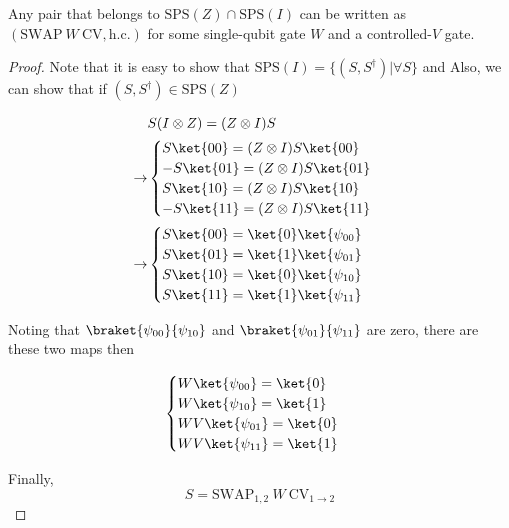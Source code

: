 \begin{lemma}
  Any pair that belongs to $\mathrm{SPS}(Z) \cap \mathrm{SPS}(I)$ 
  can be written as $(\mathrm{SWAP} ~ W ~ \mathrm{CV}, \text{h.c.})$ for some single-qubit gate $W$ and a controlled-$V$ gate.
\end{lemma}
\begin{proof}
Note that it is easy to show that $\mathrm{SPS}(I) = \{ (S, S^\dagger) | \forall S \}$ and 
Also, we can show that if $(S, S^\dagger) \in \mathrm{SPS}(Z)$

\begin{equation}
  \begin{aligned}
  &S(I \otimes Z) = (Z \otimes I) S \\
  \rightarrow &\begin{cases}
    S\ket{00} = (Z \otimes I) S\ket{00} \\
    - S\ket{01} = (Z \otimes I) S\ket{01} \\
    S\ket{10} = (Z \otimes I) S\ket{10} \\
    - S\ket{11} = (Z \otimes I) S\ket{11}
  \end{cases} \\
  \rightarrow &\begin{cases}
    S\ket{00} = \ket{0}\ket{\psi_{00}} \\
    S\ket{01} = \ket{1}\ket{\psi_{01}} \\
    S\ket{10} = \ket{0}\ket{\psi_{10}} \\
    S\ket{11} = \ket{1}\ket{\psi_{11}}
  \end{cases} \\
  \end{aligned}
\end{equation}

Noting that $\braket{\psi_{00}}{\psi_{10}}$ and $\braket{\psi_{01}}{\psi_{11}}$ are zero, there are these two maps then

\begin{equation}
  \begin{cases}
  W\ket{\psi_{00}} = \ket{0} \\
  W\ket{\psi_{10}} = \ket{1} \\
  WV\ket{\psi_{01}} = \ket{0} \\
  WV\ket{\psi_{11}} = \ket{1}
  \end{cases}
\end{equation}

Finally, 
\begin{equation}
  S = \mathrm{SWAP}_{1,2} ~ W ~ \mathrm{CV}_{1\to 2}
\end{equation}
\end{proof}

